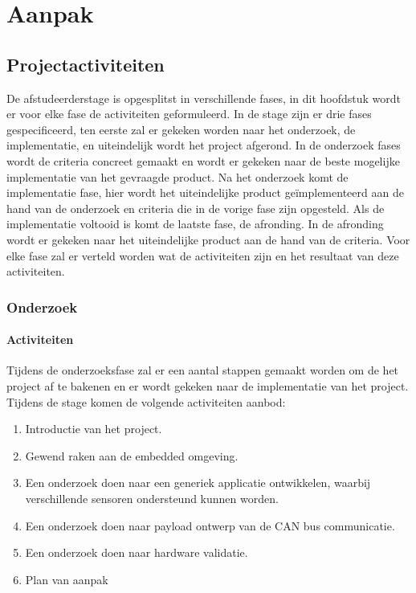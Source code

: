 \chapter{Aanpak} \label{ch:aanpak}

\section{Projectactiviteiten}
De afstudeerderstage is opgesplitst in verschillende fases, in dit hoofdstuk wordt er voor elke fase de activiteiten geformuleerd. In de stage zijn er drie fases gespecificeerd, ten eerste zal er gekeken worden naar het onderzoek, de implementatie, en uiteindelijk wordt het project afgerond. In de onderzoek fases wordt de criteria concreet gemaakt en wordt er gekeken naar de beste mogelijke implementatie van het gevraagde product. Na het onderzoek komt de implementatie fase, hier wordt het uiteindelijke product geïmplementeerd aan de hand van de onderzoek en criteria die in de vorige fase zijn opgesteld. Als de implementatie voltooid is komt de laatste fase, de afronding. In de afronding wordt er gekeken naar het uiteindelijke product aan de hand van de criteria. Voor elke fase zal er verteld worden wat de activiteiten zijn en het resultaat van deze activiteiten.

\subsection{Onderzoek}
\subsubsection{Activiteiten}
Tijdens de onderzoeksfase zal er een aantal stappen gemaakt worden om de het project af te bakenen en er wordt gekeken naar de implementatie van het project. Tijdens de stage komen de volgende activiteiten aanbod:
\begin{enumerate}
	\item Introductie van het project.
	\item Gewend raken aan de embedded omgeving.
	\item Een onderzoek doen naar een generiek applicatie ontwikkelen, waarbij verschillende sensoren ondersteund kunnen worden.
	\item Een onderzoek doen naar payload ontwerp van de CAN bus communicatie.
	\item Een onderzoek doen naar hardware validatie.
	\item Plan van aanpak
\end{enumerate}

